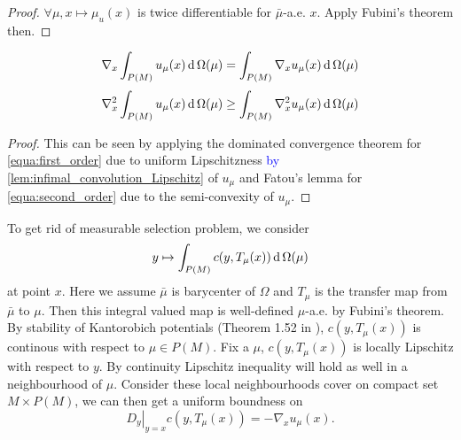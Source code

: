 \begin{proof}
	$\forall \mu, x \mapsto \mu_u(x)$ is twice differentiable for $\bar{\mu}$-a.e. $x$. Apply Fubini's theorem then.
\end{proof}

\begin{prop} 
	\begin{equation}
		\label{equa:first_order}
		\nabla _ { x } \int _ { P ( M ) } u _ { \mu } ( x ) \operatorname{d} \Omega ( \mu ) = \int _ { P ( M ) } \nabla _ { x } u _ { \mu } ( x ) \operatorname{d} \Omega ( \mu )
	\end{equation}
	\begin{equation}
		\label{equa:second_order}
		\nabla _ { x } ^ { 2 } \int _ { P ( M ) } u _ { \mu } ( x ) \operatorname{d} \Omega ( \mu ) \geq \int _ { P ( M ) } \nabla _ { x } ^ { 2 } u _ { \mu } ( x ) \operatorname{d} \Omega ( \mu )
	\end{equation}
\end{prop}

\begin{proof}
	This can be seen by applying the dominated convergence theorem for \cref{equa:first_order} due to uniform Lipschitzness \textcolor{blue}{by \cref{lem:infimal_convolution_Lipschitz}} of \( u _ { \mu } \) and Fatou's lemma for \cref{equa:second_order} due to the semi-convexity
	of \( u _ { \mu } . \)
\end{proof}

To get rid of measurable selection problem, we consider
\[ y \mapsto \int_{P(M)} c(y, T_{\mu}(x)) \operatorname{d} \Omega ( \mu)\]
at point $x$.
Here we assume $\bar{\mu}$ is barycenter of $\Omega$ and $T_{\mu}$ is the transfer map from $\bar{\mu}$ to $\mu$.
Then this integral valued map is well-defined $\mu$-a.e. by Fubini's theorem.
By stability of Kantorobich potentials (Theorem 1.52 in \cite{Santambrogio2015}), $c(y, T_{\mu}(x))$ is continous with respect to $\mu \in P(M)$.
Fix a $\mu$, $c(y, T_{\mu}(x))$ is locally Lipschitz with respect to $y$.
By continuity Lipschitz inequality will hold as well in a neighbourhood of $\mu$.
Consider these local neighbourhoods cover on compact set $ M \times P(M)$,
we can then get a uniform boundness on
\[\left. D_y\right|_{y=x} c(y, T_{\mu}(x)) = - \nabla_x u_{\mu}(x).\]


